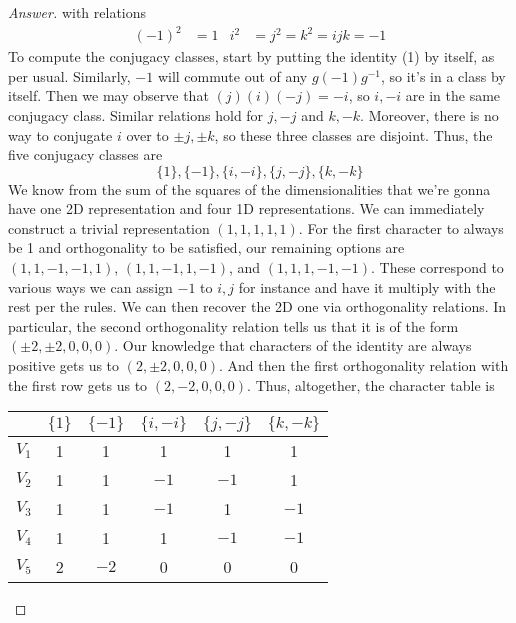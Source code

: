 \documentclass[../notes.tex]{subfiles}
\begin{document}
\begin{itemize}
\begin{proof}[Answer]
        with relations
        \begin{align*}
            (-1)^2 &= 1&
            i^2 &= j^2 = k^2 = ijk = -1
        \end{align*}
        To compute the conjugacy classes, start by putting the identity (1) by itself, as per usual. Similarly, $-1$ will commute out of any $g(-1)g^{-1}$, so it's in a class by itself. Then we may observe that $(j)(i)(-j)=-i$, so $i,-i$ are in the same conjugacy class. Similar relations hold for $j,-j$ and $k,-k$. Moreover, there is no way to conjugate $i$ over to $\pm j,\pm k$, so these three classes are disjoint. Thus, the five conjugacy classes are
        \begin{equation*}
            \{1\},\{-1\},\{i,-i\},\{j,-j\},\{k,-k\}
        \end{equation*}
        We know from the sum of the squares of the dimensionalities that we're gonna have one 2D representation and four 1D representations. We can immediately construct a trivial representation $(1,1,1,1,1)$. For the first character to always be 1 and orthogonality to be satisfied, our remaining options are $(1,1,-1,-1,1)$, $(1,1,-1,1,-1)$, and $(1,1,1,-1,-1)$. These correspond to various ways we can assign $-1$ to $i,j$ for instance and have it multiply with the rest per the rules. We can then recover the 2D one via orthogonality relations. In particular, the second orthogonality relation tells us that it is of the form $(\pm 2,\pm 2,0,0,0)$. Our knowledge that characters of the identity are always positive gets us to $(2,\pm 2,0,0,0)$. And then the first orthogonality relation with the first row gets us to $(2,-2,0,0,0)$. Thus, altogether, the character table is
        \begin{table}[h!]
            \centering
            \small
            \renewcommand{\arraystretch}{1.4}
            \begin{tabular}{c|c|c|c|c|c|}
                      & $\{1\}$ & $\{-1\}$ & $\{i,-i\}$ & $\{j,-j\}$ & $\{k,-k\}$\\
                \hline
                $V_1$ & 1 & 1 & 1 & 1 & 1\\ \hline
                $V_2$ & 1 & 1 & $-1$ & $-1$ & 1\\ \hline
                $V_3$ & 1 & 1 & $-1$ & 1 & $-1$\\ \hline
                $V_4$ & 1 & 1 & 1 & $-1$ & $-1$\\ \hline
                $V_5$ & 2 & $-2$ & 0 & 0 & 0\\
            \end{tabular}

\end{table}
\end{proof}
\end{itemize}
\end{document}

